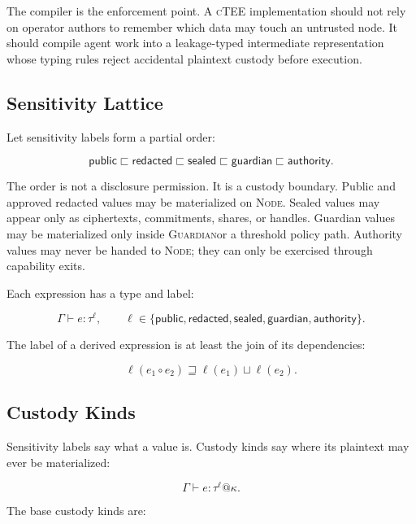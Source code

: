 \documentclass[11pt]{article}
\newcommand{\ctee}{\textnormal{\textsc{cTEE}}}
\newcommand{\roletext}[1]{\textnormal{\textsc{#1}}\xspace}
\newcommand{\node}{\ifmmode\mathsf{Node}\else\roletext{Node}\fi}
\newcommand{\guard}{\ifmmode\mathsf{Guardian}\else\roletext{Guardian}\fi}
\begin{document}
The compiler is the enforcement point. A \ctee{} implementation should not rely
on operator authors to remember which data may touch an untrusted node. It
should compile agent work into a leakage-typed intermediate representation
whose typing rules reject accidental plaintext custody before execution.

\subsection{Sensitivity Lattice}

Let sensitivity labels form a partial order:

\[
\mathsf{public} \sqsubset
\mathsf{redacted} \sqsubset
\mathsf{sealed} \sqsubset
\mathsf{guardian} \sqsubset
\mathsf{authority}.
\]

The order is not a disclosure permission. It is a custody boundary. Public and
approved redacted values may be materialized on \node. Sealed values may appear
only as ciphertexts, commitments, shares, or handles. Guardian values may be
materialized only inside \guard or a threshold policy path. Authority values may
never be handed to \node; they can only be exercised through capability exits.

Each expression has a type and label:

\[
\Gamma \vdash e : \tau^{\ell},
\qquad
\ell \in
\{\mathsf{public}, \mathsf{redacted}, \mathsf{sealed},
\mathsf{guardian}, \mathsf{authority}\}.
\]

The label of a derived expression is at least the join of its dependencies:

\[
\ell(e_1 \circ e_2) \sqsupseteq \ell(e_1) \sqcup \ell(e_2).
\]

\subsection{Custody Kinds}

Sensitivity labels say what a value is. Custody kinds say where its plaintext
may ever be materialized:

\[
\Gamma \vdash e : \tau^{\ell}@\kappa.
\]

\noindent The base custody kinds are:
\end{document}
